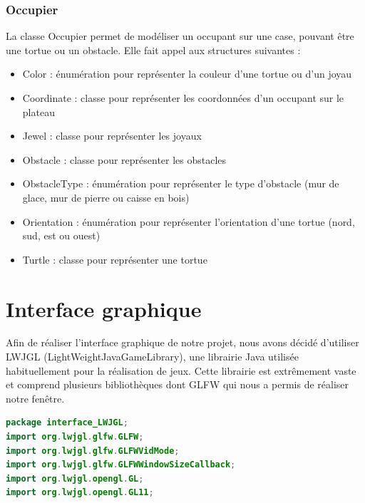 \documentclass{article}
\begin{document}
		\subsubsection{Occupier}
		\label{sec:occupier}
\indent		La classe Occupier permet de modéliser un occupant sur une case, pouvant être une tortue ou un obstacle. Elle fait appel aux structures suivantes : 
			\begin{itemize}
  				\item Color : énumération pour représenter la couleur d'une tortue ou d'un joyau 
  				\item Coordinate : classe pour représenter les coordonnées d'un occupant sur le plateau
				\item Jewel : classe pour représenter les joyaux
				\item Obstacle : classe pour représenter les obstacles
				\item ObstacleType : énumération pour représenter le type d'obstacle (mur de glace, mur de pierre ou caisse en bois)
				\item Orientation : énumération pour représenter l'orientation d'une tortue (nord, sud, est ou ouest)
				\item Turtle : classe pour représenter une tortue
			\end{itemize}
		
\section{Interface graphique}
	\label{sec:interfaceGraphique}
\indent Afin de réaliser l'interface graphique de notre projet, nous avons décidé d'utiliser LWJGL (LightWeightJavaGameLibrary), une librairie Java utilisée habituellement pour la réalisation de jeux.
	Cette librairie est extrêmement vaste et comprend plusieurs bibliothèques dont GLFW qui nous a permis de réaliser notre fenêtre.
		\begin{lstlisting}[language=Java]
package interface_LWJGL;
import org.lwjgl.glfw.GLFW;
import org.lwjgl.glfw.GLFWVidMode;
import org.lwjgl.glfw.GLFWWindowSizeCallback;
import org.lwjgl.opengl.GL;
import org.lwjgl.opengl.GL11;
		\end{lstlisting}
\end{document}
